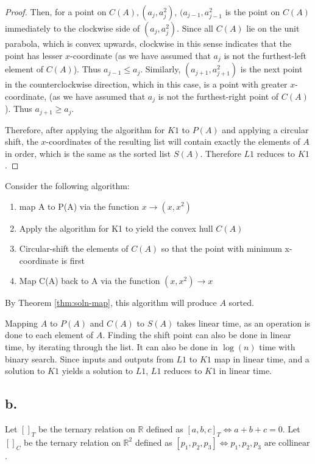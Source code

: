 \documentclass[11pt]{article}
\begin{document}
\begin{proof}
    Then, for a point on $C(A), (a_j, a_j^2)$, $(a_{j-1}, a_{j-1}^2$ is the point on $C(A)$ immediately to the clockwise side of $(a_j, a_j^2)$. Since all $C(A)$ lie on the unit parabola, which is convex upwards, clockwise in this sense indicates that the point has lesser $x$-coordinate (as we have assumed that $a_j$ is not the furthest-left element of $C(A)$). Thus $a_{j-1} \leq a_j$. Similarly, $(a_{j+1}, a_{j+1}^2)$ is the next point in the counterclockwise direction, which in this case, is a point with greater $x$-coordinate, (as we have assumed that $a_j$ is not the furthest-right point of $C(A)$). Thus $a_{j+1} \geq a_j$.

    Therefore, after applying the algorithm for $K1$ to $P(A)$ and applying a circular shift, the $x$-coordinates of the resulting list will contain exactly the elements of $A$ in order, which is the same as the sorted list $S(A)$. Therefore $L1$ reduces to $K1$.
\end{proof}

\pagebreak
Consider the following algorithm: 
\begin{enumerate}
    \item map A to P(A) via the function $x \to (x, x^2)$
    \item Apply the algorithm for K1 to yield the convex hull $C(A)$
    \item Circular-shift the elements of $C(A)$ so that the point with minimum x-coordinate is first 
    \item Map C(A) back to A via the function $(x, x^2) \to x$
\end{enumerate}

By Theorem \ref{thm:soln-map}, this algorithm will produce $A$ sorted. 

Mapping $A$ to $P(A)$ and $C(A)$ to $S(A)$ takes linear time, as an operation is done to each element of $A$. Finding the shift point can also be done in linear time, by iterating through the list. It can also be done in 
$\log(n)$ time with binary search. Since inputs and outputs from $L1$ to $K1$ map in linear time, and a solution to $K1$ yields a solution to $L1$, $L1$ reduces to $K1$ in linear time.

\subsection*{b.}

Let $[]_T$ be the ternary relation on $\mathbb{R}$ defined as $[a, b, c]_T \iff a + b + c = 0$.
Let $[]_{C}$ be the ternary relation on $\mathbb{R}^2$ defined as $[p_1, p_2, p_3] \iff p_1, p_2, p_3 \text{ are collinear}$.
\end{document}
